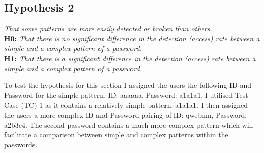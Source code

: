 \documentclass{article}
\begin{document}
\subsection{Hypothesis 2}
\begin{center}
\textit{That some patterns are more easily detected or broken than others.} \newline \\

\textbf{H0:} \textit{That	there	is no significant difference in	the	detection (access)	rate	between	a	simple	and	a	complex	pattern	of	a password.} \newline \\
\textbf{H1:} \textit{That	there	is a significant difference in	the	detection (access)	rate	between	a	simple	and	a	complex	pattern	of	a password.} \newline \\
\end{center}

To test the hypothesis for this section I assigned the users the following ID and Password for the simple pattern, ID: aaaaaa, Password: a1a1a1. I utilised Test Case (TC) 1 as it contains a relatively simple pattern: a1a1a1. I then assigned the users a more complex ID and Password pairing of ID: qwebnm, Password: a2b3c4. The second password contains a much more complex pattern which will facilitate a comparison between simple and complex patterns within the passwords. 
\end{document}
